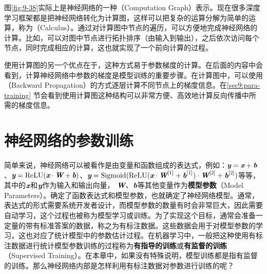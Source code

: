 \parinterval 图\ref{fig:9-38}实际上是神经网络的一种{\small{}}（Computation Graph）表示。现在很多深度学习框架都是把神经网络转化为计算图，这样可以把复杂的运算分解为简单的运算，称为{\small{}}（Calculus）。通过对计算图中节点的遍历，可以方便地完成神经网络的计算。比如，可以对图中节点进行拓扑排序（由输入到输出），之后依次访问每个节点，同时完成相应的计算，这也就实现了一个前向计算的过程。

\parinterval 使用计算图的另一个优点在于，这种方式易于参数梯度的计算。在后面的内容中会看到，计算神经网络中参数的梯度是模型训练的重要步骤。在计算图中，可以使用{\small{}} （Backward Propagation）的方式逐层计算不同节点上的梯度信息。在\ref{sec9:para-training} 节会看到使用计算图这种结构可以非常方便、高效地计算反向传播中所需的梯度信息。


\sectionnewpage
\section{神经网络的参数训练}

\parinterval 简单来说，神经网络可以被看作是由变量和函数组成的表达式，例如：$ {\textbf{\em y}}={\textbf{\em x}}+{\textbf{\em b}} $、$ {\textbf{\em y}}={\textrm{ReLU}}({\textbf{\em x}}\cdot {\textbf{\em W}}+{\textbf{\em b}}) $、$ {\textbf{\em y}}={\textrm{Sigmoid}}({\textrm{ReLU}}({\textbf{\em x}}\cdot {\textbf{\em W}}^{[1]}+{\textbf{\em b}}^{[1]})\cdot {\textbf{\em W}}^{[2]}+{\textbf{\em b}}^{[2]}) $等等，其中的$ {\textbf{\em x}} $和$ {\textbf{\em y}} $作为输入和输出向量， ${\textbf{\em W}}$、${\textbf{\em b}}$等其他变量作为{\small\sffamily\bfseries{模型参数}}（Model Parameters）。确定了函数表达式和模型参数，也就确定了神经网络模型。通常，表达式的形式需要系统开发者设计，而模型参数的数量有时会非常巨大，因此需要自动学习，这个过程也被称为模型学习或训练。为了实现这个目标，通常会准备一定量的带有标准答案的数据，称之为有标注数据。这些数据会用于对模型参数的学习，这也对应了统计模型中的参数估计过程。在机器学习中，一般把这种使用有标注数据进行统计模型参数训练的过程称为{\small\sffamily\bfseries{有指导的训练}}或{\small\sffamily\bfseries{有监督的训练}}（Supervised Training）。在本章中，如果没有特殊说明，模型训练都是指有监督的训练。那么神经网络内部是怎样利用有标注数据对参数进行训练的呢？

